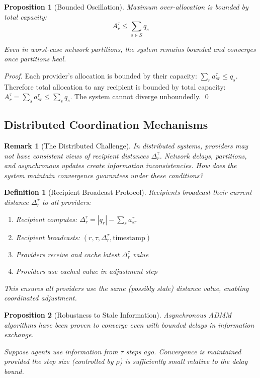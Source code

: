 \documentclass[11pt]{article}
\newtheorem{definition}{Definition}
\newtheorem{proposition}{Proposition}
\newtheorem{remark}{Remark}
\begin{document}
\begin{proposition}[Bounded Oscillation]
Maximum over-allocation is bounded by total capacity:
\[
A_r^\tau \leq \sum_{s \in S} q_s
\]

Even in worst-case network partitions, the system remains bounded and converges once partitions heal.
\end{proposition}

\begin{proof}
Each provider's allocation is bounded by their capacity: $\sum_r a_{sr}^\tau \leq q_s$. Therefore total allocation to any recipient is bounded by total capacity: $A_r^\tau = \sum_s a_{sr}^\tau \leq \sum_s q_s$. The system cannot diverge unboundedly. \qed
\end{proof}

\subsection{Distributed Coordination Mechanisms}

\begin{remark}[The Distributed Challenge]
In distributed systems, providers may not have consistent views of recipient distances $\Delta_r^\tau$. Network delays, partitions, and asynchronous updates create information inconsistencies. How does the system maintain convergence guarantees under these conditions?
\end{remark}

\begin{definition}[Recipient Broadcast Protocol]
Recipients broadcast their current distance $\Delta_r^\tau$ to all providers:
\begin{enumerate}
\item Recipient computes: $\Delta_r^\tau = |q_r| - \sum_s a_{sr}^\tau$
\item Recipient broadcasts: $(r, \tau, \Delta_r^\tau, \text{timestamp})$
\item Providers receive and cache latest $\Delta_r^\tau$ value
\item Providers use cached value in adjustment step
\end{enumerate}

This ensures all providers use the same (possibly stale) distance value, enabling coordinated adjustment.
\end{definition}

\begin{proposition}[Robustness to Stale Information]
\label{prop:stale-robustness}
Asynchronous ADMM algorithms have been proven to converge even with bounded delays in information exchange. 

Suppose agents use information from $\tau$ steps ago. Convergence is maintained provided the step size (controlled by $\rho$) is sufficiently small relative to the delay bound.
\end{proposition}
\end{document}
